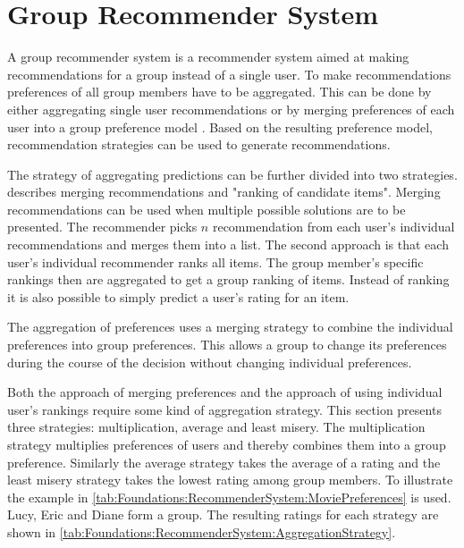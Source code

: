 \section{Group Recommender System}
\label{sec:Foundations:GroupRecommenderSystem}

A group recommender system is a recommender system aimed at making recommendations for a group instead of a single user. To make recommendations preferences of all group members have to be aggregated. This can be done by either aggregating single user recommendations or by merging preferences of each user into a group preference model \cite{jamesonRecommendationGroups2007}. Based on the resulting preference model, recommendation strategies can be used to generate recommendations.

The strategy of aggregating predictions can be further divided into two strategies. \citeauthor{felfernigAlgorithmsGroupRecommendation2018} \cite{felfernigAlgorithmsGroupRecommendation2018} describes merging recommendations and "ranking of candidate items". Merging recommendations can be used when multiple possible solutions are to be presented. The recommender picks $n$ recommendation from each user's individual recommendations and merges them into a list. The second approach is that each user's individual recommender ranks all items. The group member's specific rankings then are aggregated to get a group ranking of items. Instead of ranking it is also possible to simply predict a user's rating for an item.

The aggregation of preferences uses a merging strategy to combine the individual preferences into group preferences. This allows a group to change its preferences during the course of the decision without changing individual preferences.

Both the approach of merging preferences and the approach of using individual user's rankings require some kind of aggregation strategy. This section presents three strategies: multiplication, average and least misery. The multiplication strategy multiplies preferences of users and thereby combines them into a group preference. Similarly the average strategy takes the average of a rating and the least misery strategy takes the lowest rating among group members. To illustrate the example in \autoref{tab:Foundations:RecommenderSystem:MoviePreferences} is used. Lucy, Eric and Diane form a group. The resulting ratings for each strategy are shown in \autoref{tab:Foundations:RecommenderSystem:AggregationStrategy}.

